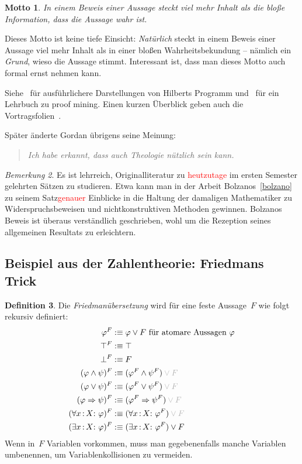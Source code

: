 \documentclass[a4paper,ngerman,12pt]{scrartcl}
\theoremstyle{definition}
\newtheorem{defn}{Definition}[section]
\theoremstyle{plain}
\newtheorem{motto}[defn]{Motto}
\theoremstyle{remark}
\newtheorem{bem}[defn]{Bemerkung}
\renewcommand{\_}{\mathpunct{.}\,}
\newcommand{\?}{\,{:}\,}
\newcommand{\XXX}[1]{\textcolor{red}{#1}}
\begin{document}
\begin{motto}\label{motto:inhaltvonbeweisen}In einem \emph{Beweis} einer
Aussage steckt viel mehr Inhalt als die bloße Information, dass die Aussage
wahr ist.\end{motto}

Dieses Motto ist keine tiefe Einsicht: \emph{Natürlich} steckt in
einem Beweis einer Aussage viel mehr Inhalt als in einer bloßen
Wahrheitsbekundung -- nämlich ein \emph{Grund}, wieso die Aussage stimmt.
Interessant ist, dass man dieses Motto auch formal ernst nehmen kann.

Siehe~\cite{plato:hilbert,zach:hilbert,raatikainen:hilbert} für ausführlichere
Darstellungen von
Hilberts Programm und~\cite{kohlenbach:applprooftheory} für ein Lehrbuch zu
proof mining. Einen kurzen Überblick geben auch die
Vortragsfolien~\cite{avigad:proofmining}.

Später änderte Gordan übrigens seine Meinung:
\begin{quote}
\emph{Ich habe erkannt, dass auch Theologie nützlich sein kann.}
\end{quote}

\begin{bem}Es ist lehrreich, Originalliteratur zu \XXX{heutzutage} im ersten
Semester gelehrten Sätzen zu studieren. Etwa kann man in der Arbeit
Bolzanos~\ref{bolzano} zu seinem Satz\XXX{genauer} Einblicke in die Haltung der
damaligen Mathematiker zu Widerspruchsbeweisen und nichtkonstruktiven Methoden
gewinnen. Bolzanos Beweis ist überaus verständlich geschrieben, wohl
um die Rezeption seines allgemeinen Resultats zu erleichtern.\end{bem}


\subsection{Beispiel aus der Zahlentheorie: Friedmans Trick}

\label{sect:friedman}%
\begin{defn}Die \emph{Friedmanübersetzung}
wird für eine feste Aussage~$F$ wie folgt rekursiv definiert:
\newcommand{\optF}{\textcolor{grey}{\phantom{}\vee F}}
\begin{align*}
  \varphi^F &:\equiv \varphi \vee F \text{ für atomare Aussagen~$\varphi$} \\
  \top^F &:\equiv \top \\
  \bot^F &:\equiv F \\
  (\varphi \wedge \psi)^F &:\equiv (\varphi^F \wedge \psi^F) \optF \\
  (\varphi \vee \psi)^F &:\equiv (\varphi^F \vee \psi^F) \optF \\
  (\varphi \Rightarrow \psi)^F &:\equiv (\varphi^F \Rightarrow \psi^F) \optF \\
  (\forall x\?X{:}\ \varphi)^F &:\equiv (\forall x\?X{:}\ \varphi^F) \optF \\
  (\exists x\?X{:}\ \varphi)^F &:\equiv (\exists x\?X{:}\ \varphi^F) \vee F
\end{align*}
Wenn in~$F$ Variablen vorkommen, muss man gegebenenfalls manche Variablen umbenennen, um
Variablenkollisionen zu vermeiden.
\end{defn}
\end{document}
